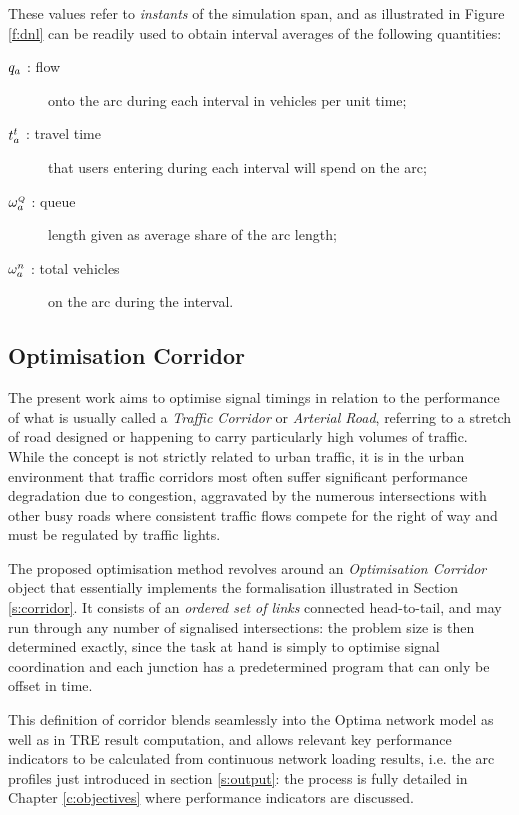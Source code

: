 These values refer to \emph{instants} of the simulation span, and as illustrated in Figure \ref{f:dnl}  can be readily used to obtain interval averages of the following quantities:
\begin{description}
\item[$q_a$ : flow]  onto the arc during each interval in vehicles per unit time;

\item[$t_{a}^t$ : travel time]  that users entering during each interval will spend on the arc; 

\item[$\omega_{a}^{\scriptscriptstyle{Q}}$ : queue] length given as average share of the arc length;

\item[$\omega_{a}^{n}$ : total vehicles] on the arc during the interval.
\end{description}


\subsection{Optimisation Corridor}
The present work aims to optimise signal timings in relation to the performance of what is usually called a \emph{Traffic Corridor} or \emph{Arterial Road}, referring to a stretch of road designed or happening to carry particularly high volumes of traffic. \\
While the concept is not strictly related to urban traffic, it is in the urban environment that traffic corridors most often suffer significant performance degradation due to congestion, aggravated by the numerous intersections with other busy roads where consistent traffic flows compete for the right of way and must be regulated by traffic lights.

The proposed optimisation method revolves around an \emph{Optimisation Corridor} object that essentially implements the formalisation illustrated in Section \ref{s:corridor}. It consists of an \emph{ordered set of links} connected head-to-tail, and may run through any number of signalised intersections: the problem size is then determined exactly, since the task at hand is simply to optimise signal coordination and each junction has a predetermined program that can only be offset in time.

This definition of corridor blends seamlessly into the Optima network model as well as in TRE result computation, and allows relevant key performance indicators to be calculated from continuous network loading results, i.e. the arc profiles just introduced in section \ref{s:output}: the process is fully detailed in Chapter \ref{c:objectives} where performance indicators are discussed.

